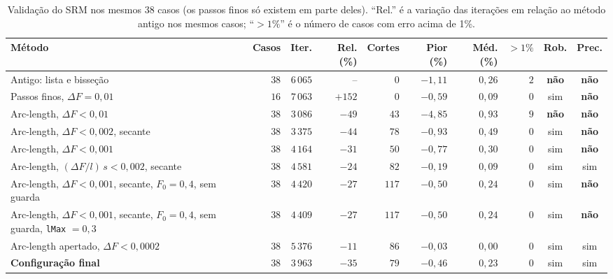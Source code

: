 \documentclass[11pt,a4paper]{article}
\numberwithin{equation}{section}
\begin{document}
\begin{table}[htbp]
\centering\footnotesize\setlength{\tabcolsep}{3.5pt}
\caption{Validação do SRM nos mesmos 38 casos (os passos finos só existem em parte deles). ``Rel.'' é a variação das iterações em relação ao método antigo nos mesmos casos; ``$>1\%$'' é o número de casos com erro acima de 1\%.}\label{tab:validacao_srm}
\begin{tabular}{p{4.3cm}rrrrrrrcc}
\toprule
Método & Casos & Iter. & Rel. (\%) & Cortes & Pior (\%) & Méd. (\%) & $>1\%$ & Rob. & Prec. \\
\midrule
Antigo: lista e bisseção & $38$ & $6\,065$ & -- & $0$ & $-1{,}11$ & $0{,}26$ & $2$ & \textbf{não} & \textbf{não} \\
Passos finos, $\Delta F = 0{,}01$ & $16$ & $7\,063$ & $+$$152$ & $0$ & $-0{,}59$ & $0{,}09$ & $0$ & sim & \textbf{não} \\
Arc-length, $\Delta F < 0{,}01$ & $38$ & $3\,086$ & $-49$ & $43$ & $-4{,}85$ & $0{,}93$ & $9$ & \textbf{não} & \textbf{não} \\
Arc-length, $\Delta F < 0{,}002$, secante & $38$ & $3\,375$ & $-44$ & $78$ & $-0{,}93$ & $0{,}49$ & $0$ & sim & \textbf{não} \\
Arc-length, $\Delta F < 0{,}001$ & $38$ & $4\,164$ & $-31$ & $50$ & $-0{,}77$ & $0{,}30$ & $0$ & sim & \textbf{não} \\
Arc-length, $(\Delta F/l)\,s < 0{,}002$, secante & $38$ & $4\,581$ & $-24$ & $82$ & $-0{,}19$ & $0{,}09$ & $0$ & sim & sim \\
Arc-length, $\Delta F < 0{,}001$, secante, $F_0 = 0{,}4$, sem guarda & $38$ & $4\,420$ & $-27$ & $117$ & $-0{,}50$ & $0{,}24$ & $0$ & sim & \textbf{não} \\
Arc-length, $\Delta F < 0{,}001$, secante, $F_0 = 0{,}4$, sem guarda, \texttt{lMax} $= 0{,}3$ & $38$ & $4\,409$ & $-27$ & $117$ & $-0{,}50$ & $0{,}24$ & $0$ & sim & \textbf{não} \\
Arc-length apertado, $\Delta F < 0{,}0002$ & $38$ & $5\,376$ & $-11$ & $86$ & $-0{,}03$ & $0{,}00$ & $0$ & sim & sim \\
\textbf{Configuração final} & $38$ & $3\,963$ & $-35$ & $79$ & $-0{,}46$ & $0{,}23$ & $0$ & sim & sim \\
\bottomrule
\end{tabular}
\end{table}
\end{document}
